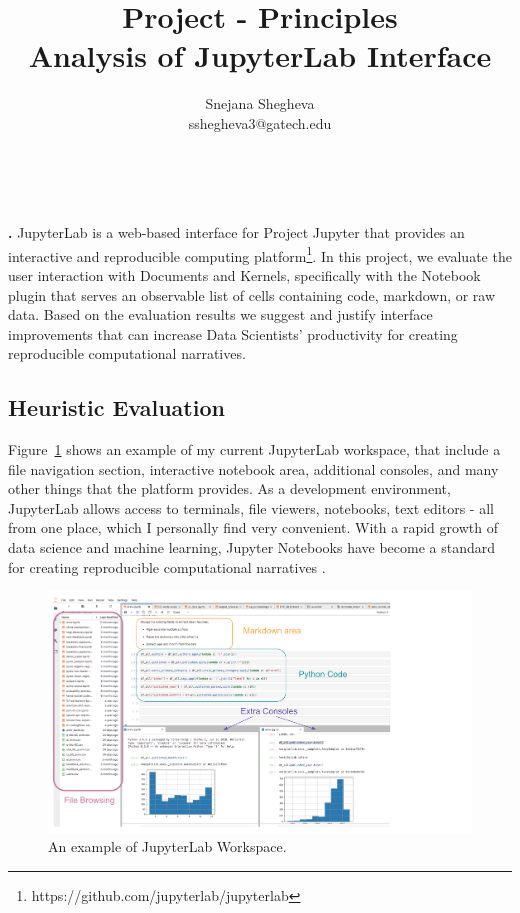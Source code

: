 \documentclass[12pt,letterpaper]{article}
\makeatletter
\renewcommand{\maketitle}{\bgroup
   \begin{center}
   \textbf{{\fontsize{18pt}{20}\selectfont \@title}}\\
   \vspace{10pt}
   {\fontsize{12pt}{0}\selectfont \@author} 
   \end{center}
}
\newenvironment{myquote}[1]%
  {\list{}{\leftmargin=#1\rightmargin=#1}\item[]}%
  {\endlist}
\renewenvironment{abstract}
{\vspace*{-.5in}\fontsize{12pt}{12}\begin{myquote}{.5in}
\noindent \par{\bfseries \abstractname.}}
{\medskip\noindent
\end{myquote}
}
\makeatother
\begin{document}
\title{Project - Principles\\Analysis of JupyterLab Interface}
\author{Snejana Shegheva \\ sshegheva3@gatech.edu}

\maketitle
\thispagestyle{fancy}

\begin{abstract}
JupyterLab is a web-based interface for Project Jupyter that provides an interactive and reproducible computing platform\footnote{https://github.com/jupyterlab/jupyterlab}. In this project, we evaluate the user interaction with Documents and Kernels, specifically with the Notebook plugin that serves an observable list of cells containing code, markdown, or raw data. Based on the evaluation results we suggest and justify interface improvements that can increase Data Scientists' productivity for creating reproducible computational narratives.
\end{abstract}

\subsection*{Heuristic Evaluation}
Figure~\ref{fig::1} shows an example of my current JupyterLab workspace, that include a file navigation section, interactive notebook area, additional consoles, and many other things that the platform provides. As a development environment, JupyterLab allows access to terminals, file viewers, notebooks, text editors - all from one place, which I personally find very convenient. With a rapid growth of data science and machine learning, Jupyter Notebooks have become a standard for creating reproducible computational narratives \cite{blog:jupyter}. 

\begin{figure}[h]
\centering
\includegraphics[scale=.5]{figures/project-principles/jupyter.png}
\caption{An example of JupyterLab Workspace.}
\label{fig::1}
\end{figure}
\end{document}

